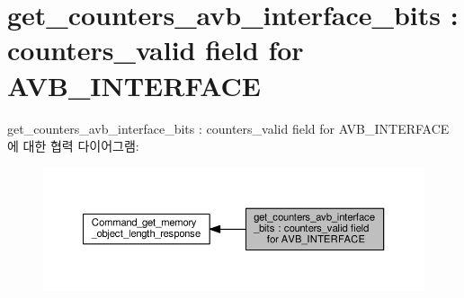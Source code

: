 \hypertarget{group__get__counters__avb__interface__bits}{}\section{get\+\_\+counters\+\_\+avb\+\_\+interface\+\_\+bits \+: counters\+\_\+valid field for A\+V\+B\+\_\+\+I\+N\+T\+E\+R\+F\+A\+CE}
\label{group__get__counters__avb__interface__bits}
get\+\_\+counters\+\_\+avb\+\_\+interface\+\_\+bits \+: counters\+\_\+valid field for A\+V\+B\+\_\+\+I\+N\+T\+E\+R\+F\+A\+C\+E에 대한 협력 다이어그램\+:
\nopagebreak
\begin{figure}[H]
\begin{center}
\leavevmode
\includegraphics[width=350pt]{group__get__counters__avb__interface__bits}
\end{center}
\end{figure}
